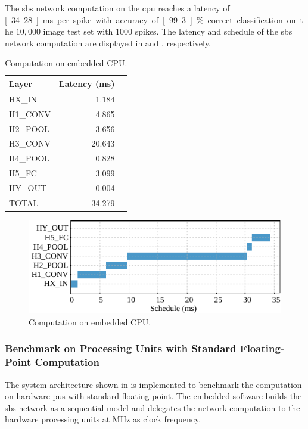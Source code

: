 The \gls{sbs} network computation on the \gls{cpu} reaches a latency of \unit[34.28]{ms} per spike with accuracy of \unit[99.3]{\%} correct classification on the $10,000$ image test set with $1000$ spikes. The latency and schedule of the \gls{sbs} network computation are displayed in  and , respectively.

\begin{table}[!t]\centering
	\caption{Computation on embedded CPU.}\label{tab:latency_sw}
	\scriptsize
\begin{tabular}{lrr}\toprule
	\textbf{Layer} &\textbf{Latency (ms)} \\\midrule
	HX\_IN &1.184 \\
	H1\_CONV &4.865 \\
	H2\_POOL &3.656 \\
	H3\_CONV &20.643 \\
	H4\_POOL &0.828 \\
	H5\_FC &3.099 \\
	HY\_OUT &0.004 \\
		
	TOTAL &34.279 \\
	\bottomrule
\end{tabular}
\end{table}

\begin{figure}[b!]
	\centering
	\includegraphics[width=0.5\columnwidth]{./chapters/sbs_accelerator/figures/latency_sw.pdf}
	\caption{Computation on embedded CPU.}
	\label{fig:latency_sw}
\end{figure}

\subsubsection{Benchmark on Processing Units with Standard Floating-Point Computation}
The system architecture shown in  is implemented to benchmark the computation on hardware \glspl{pu} with standard floating-point. The embedded software builds the \gls{sbs} network as a sequential model and delegates the network computation to the hardware processing units at \unit[200]{MHz} as clock frequency.

